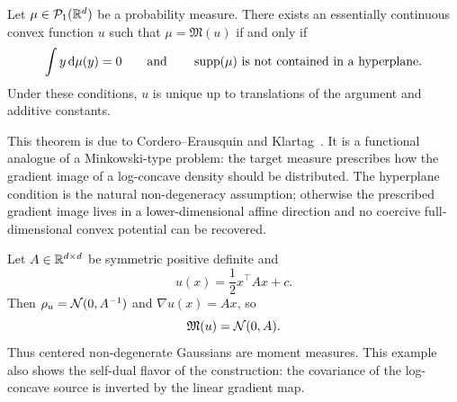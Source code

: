 \begin{thm}\label{thm-moment-measure-characterization}
	Let $\mu\in\mathcal{P}_1(\mathbb{R}^d)$ be a probability measure. There exists an essentially continuous convex function $u$ such that $\mu=\mathfrak M(u)$ if and only if
	\[
		\int y\,\mathrm{d}\mu(y)=0
		\qquad\text{and}\qquad
		\operatorname{supp}(\mu)\text{ is not contained in a hyperplane.}
	\]
	Under these conditions, $u$ is unique up to translations of the argument and additive constants.
\end{thm}

This theorem is due to Cordero--Erausquin and Klartag~\cite{CorderoErausquinKlartag2015MomentMeasures}. It is a functional analogue of a Minkowski-type problem: the target measure prescribes how the gradient image of a log-concave density should be distributed. The hyperplane condition is the natural non-degeneracy assumption; otherwise the prescribed gradient image lives in a lower-dimensional affine direction and no coercive full-dimensional convex potential can be recovered.

\begin{example}\label{ex-moment-measure-gaussian}
	Let $A\in\mathbb{R}^{d\times d}$ be symmetric positive definite and
	\[
		u(x)=\frac12 x^\top A x + c .
	\]
	Then $\rho_u=\mathcal{N}(0,A^{-1})$ and $\nabla u(x)=Ax$, so
	\[
		\mathfrak M(u)=\mathcal{N}(0,A).
	\]
	Thus centered non-degenerate Gaussians are moment measures. This example also shows the self-dual flavor of the construction: the covariance of the log-concave source is inverted by the linear gradient map.
\end{example}

